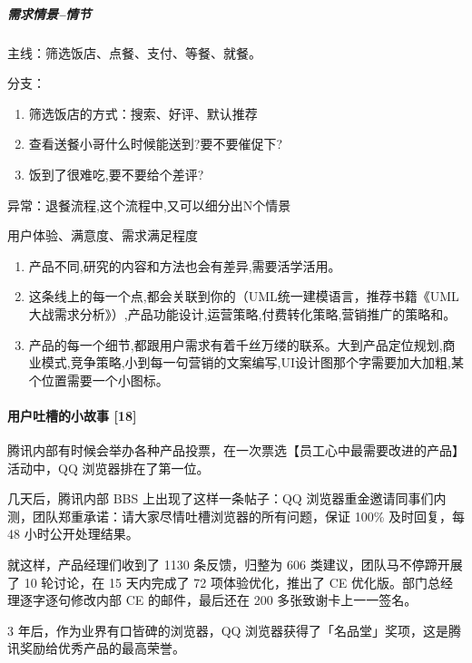 \documentclass[letterpaper,10pt,english]{sphinxmanual}
\begin{document}
\subparagraph{需求情景–情节}
\label{\detokenize{chapter_knowledge/users_analysis:id25}}
主线：筛选饭店、点餐、支付、等餐、就餐。

分支：
\begin{enumerate}
%
\item {} 
筛选饭店的方式：搜索、好评、默认推荐

\item {} 
查看送餐小哥什么时候能送到?要不要催促下?

\item {} 
饭到了很难吃,要不要给个差评?

\end{enumerate}

异常：退餐流程,这个流程中,又可以细分出N个情景

用户体验、满意度、需求满足程度
\begin{enumerate}
%
\item {} 
产品不同,研究的内容和方法也会有差异,需要活学活用。

\item {} 
这条线上的每一个点,都会关联到你的（UML统一建模语言，推荐书籍《UML大战需求分析》）,产品功能设计,运营策略,付费转化策略,营销推广的策略和。

\item {} 
产品的每一个细节,都跟用户需求有着千丝万缕的联系。大到产品定位规划,商业模式,竞争策略,小到每一句营销的文案编写,UI设计图那个字需要加大加粗,某个位置需要一个小图标。

\end{enumerate}


\paragraph{用户吐槽的小故事 {[}18{]}}
\label{\detokenize{chapter_knowledge/users_analysis:id26}}
腾讯内部有时候会举办各种产品投票，在一次票选【员工心中最需要改进的产品】活动中，QQ
浏览器排在了第一位。

几天后，腾讯内部 BBS 上出现了这样一条帖子：QQ
浏览器重金邀请同事们内测，团队郑重承诺：请大家尽情吐槽浏览器的所有问题，保证
100\% 及时回复，每 48 小时公开处理结果。

就这样，产品经理们收到了 1130 条反馈，归整为 606
类建议，团队马不停蹄开展了 10 轮讨论，在 15 天内完成了 72
项体验优化，推出了 CE 优化版。部门总经理逐字逐句修改内部 CE
的邮件，最后还在 200 多张致谢卡上一一签名。

3 年后，作为业界有口皆碑的浏览器，QQ
浏览器获得了「名品堂」奖项，这是腾讯奖励给优秀产品的最高荣誉。
\end{document}
